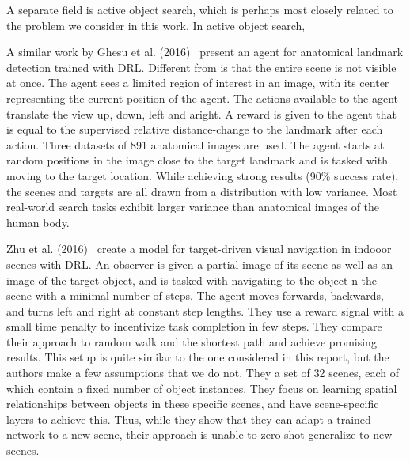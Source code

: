 A separate field is active object search, which is perhaps most closely related to the problem we consider in this work.
In active object search, %


% 

A similar work by Ghesu et al. (2016)~\cite{ghesu_artificial_2016} present an agent for anatomical landmark detection trained with DRL.
Different from \cite{caicedo_active_2015} is that the entire scene is not visible at once.
The agent sees a limited region of interest in an image, with its center representing the current position of the agent.
The actions available to the agent translate the view up, down, left and aright.
A reward is given to the agent that is equal to the supervised relative distance-change to the landmark after each action.
Three datasets of 891 anatomical images are used.
The agent starts at random positions in the image close to the target landmark and is tasked with moving to the target location.
While achieving strong results (90\% success rate), the scenes and targets are all drawn from a distribution with low variance.
Most real-world search tasks exhibit larger variance than anatomical images of the human body.

Zhu et al. (2016)~\cite{zhu_target_driven_2016} create a model for target-driven visual navigation in indooor scenes with DRL.
An observer is given a partial image of its scene as well as an image of the target object, and is tasked with navigating to the object n the scene with a minimal number of steps.
The agent moves forwards, backwards, and turns left and right at constant step lengths.
They use a reward signal with a small time penalty to incentivize task completion in few steps.
They compare their approach to random walk and the shortest path and achieve promising results.
This setup is quite similar to the one considered in this report, but the authors make a few assumptions that we do not.
They a set of 32 scenes, each of which contain a fixed number of object instances.
They focus on learning spatial relationships between objects in these specific scenes, and have scene-specific layers to achieve this.
Thus, while they show that they can adapt a trained network to a new scene, their approach is unable to zero-shot generalize to new scenes.

